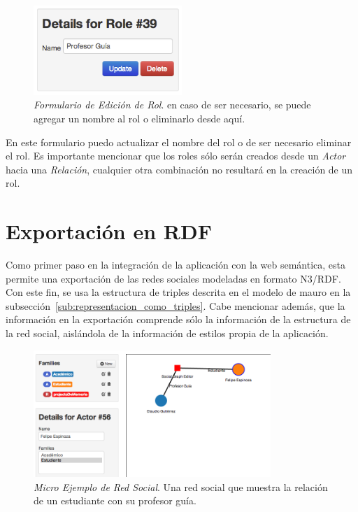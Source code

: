 \begin{figure}[H]
  \centering
  \includegraphics[width=0.5\textwidth]{images/edicion_rol.png}
  \caption[Formulario de Edición de Rol]{\emph{Formulario de Edición de Rol}. en caso de ser necesario, se puede agregar un nombre al rol o eliminarlo desde aquí.}
  \label{edicion_rol}
\end{figure}

En este formulario puedo actualizar el nombre del rol o de ser necesario eliminar el rol. Es importante mencionar que los roles sólo serán creados desde un \emph{Actor} hacia una \emph{Relación}, cualquier otra combinación no resultará en la creación de un rol.



\section{Exportación en RDF} %
\label{sec:exportacion_en_rdf}

Como primer paso en la integración de la aplicación con la web semántica, esta permite una exportación de las redes sociales modeladas en formato N3/RDF. Con este fin, se usa la estructura de triples descrita en el modelo de mauro en la subsección~\ref{sub:representacion_como_triples}. Cabe mencionar además, que la información en la exportación comprende sólo la información de la estructura de la red social, aislándola de la información de estilos propia de la aplicación.

\begin{figure}[H]
  \centering
  \includegraphics[width=0.8\textwidth]{images/mini_red_ejemplo.png}
  \caption[Micro Ejemplo de Red Social]{\emph{Micro Ejemplo de Red Social}. Una red social que muestra la relación de un estudiante con su profesor guía.}
  \label{mini_red_ejemplo}
\end{figure}

